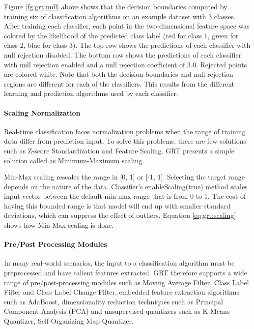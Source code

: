 

Figure \ref{fg:grt:null} above shows that the decision boundaries computed by training six of classification algorithms on an example dataset with 3 classes. After training each classifier, each point in the two-dimensional feature space was colored by the likelihood of the predicted class label (red for class 1, green for class 2, blue for class 3). The top row shows the predictions of each classifier with null rejection disabled. The bottom row shows the predictions of each classifier with null rejection enabled and a null rejection coefficient of 3.0. Rejected points are colored white. Note that both the decision boundaries and null-rejection regions are different for each of the classifiers. This results from the different learning and prediction algorithms used by each classifier. 

\paragraph*{Scaling Normalization} Real-time classification faces normalization problems when the range of training data differ from prediction input. To solve this problems, there are few solutions such as Z-score Standardization and Feature Scaling. GRT presents a simple solution called as Minimum-Maximum scaling.

Min-Max scaling rescales the range in [0, 1] or [-1, 1]. Selecting the target range depends on the nature of the data. Classifier's enableScaling(true) method scales input vector between the default min-max range that is from 0 to 1. The cost of having this bounded range is that model will end up with smaller standard deviations, which can suppress the effect of outliers. Equation \ref{eq:grt:scaling} shows how Min-Max scaling is done.



\paragraph*{Pre/Post Processing Modules} In many real-world scenarios, the input to a classification algorithm must be preprocessed and have salient features extracted. GRT therefore supports a wide range of pre/post-processing modules such as Moving Average Filter, Class Label Filter and Class Label Change Filter, embedded feature extraction algorithms such as AdaBoost, dimensionality reduction techniques such as Principal Component Analysis (PCA) and unsupervised quantizers such as K-Means Quantizer, Self-Organizing Map Quantizer.

